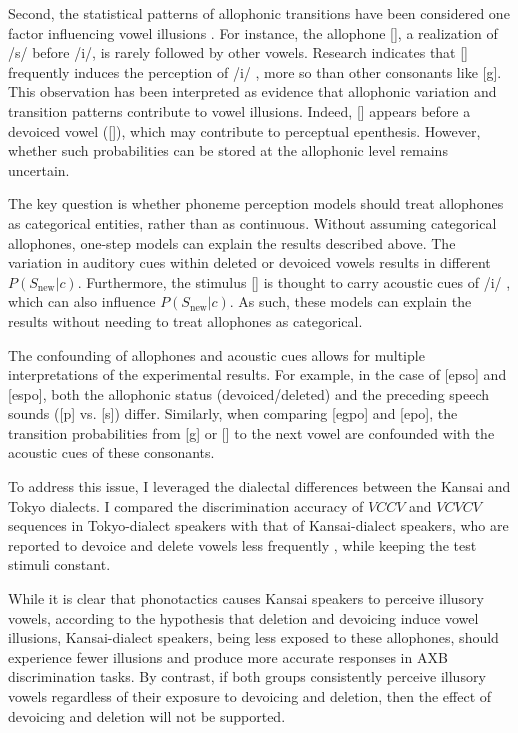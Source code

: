 Second, the statistical patterns of allophonic transitions have been considered one factor influencing vowel illusions \parencite{kilpatrick2020japanese}.  
For instance, the allophone [\textctc], a realization of /s/ before /i/, is rarely followed by other vowels.  
Research indicates that [\textctc{}] frequently induces the perception of /i/ \parencite{kilpatrick2020japanese}, more so than other consonants like [g].  
This observation has been interpreted as evidence that allophonic variation and transition patterns contribute to vowel illusions.  
Indeed, [\textctc] appears before a devoiced vowel ([\textctc{}]), which may contribute to perceptual epenthesis.  
However, whether such probabilities can be stored at the allophonic level remains uncertain.

The key question is whether phoneme perception models should treat allophones as categorical entities, rather than as continuous. Without assuming categorical allophones, one-step models can explain the results described above. The variation in auditory cues within deleted or devoiced vowels results in different $P(S_{\text{new}}|c)$. Furthermore, the stimulus [\textctc] is thought to carry acoustic cues of /i/ \parencite{kubozono1999japanese_eng}, which can also influence $P(S_{\text{new}}|c)$. As such, these models can explain the results without needing to treat allophones as categorical.

The confounding of allophones and acoustic cues allows for multiple interpretations of the experimental results. For example, in the case of [ep\textsubring{\textturnm}so] and [espo], both the allophonic status (devoiced/deleted) and the preceding speech sounds ([p] vs. [s]) differ. Similarly, when comparing [egpo] and [e\textctc{}po], the transition probabilities from [g] or [\textctc] to the next vowel are confounded with the acoustic cues of these consonants.

To address this issue, I leveraged the dialectal differences between the Kansai and Tokyo dialects.  
I compared the discrimination accuracy of $VCCV$ and $VCVCV$ sequences in Tokyo-dialect speakers  
with that of Kansai-dialect speakers, who are reported to devoice and delete vowels less frequently \parencite{byun2011_eng, byun2012_eng},  
while keeping the test stimuli constant.

While it is clear that phonotactics causes Kansai speakers to perceive illusory vowels,  
according to the hypothesis that deletion and devoicing induce vowel illusions,  
Kansai-dialect speakers, being less exposed to these allophones,  
should experience fewer illusions and produce more accurate responses in AXB discrimination tasks.  
By contrast, if both groups consistently perceive illusory vowels 
regardless of their exposure to devoicing and deletion,
then the effect of devoicing and deletion will not be supported.

